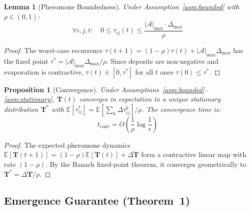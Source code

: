 \documentclass[review,3p,twocolumn]{elsarticle}
\newtheorem{lemma}[theorem]{Lemma}
\newtheorem{proposition}[theorem]{Proposition}
\newcommand{\calA}{\mathcal{A}}
\newcommand{\Tmat}{\mathbf{T}}
\begin{document}
\begin{lemma}[Pheromone Boundedness]
\label{lem:bound}
Under Assumption~\ref{asm:bounded} with $\rho \in (0,1)$:
\begin{equation}
\forall i, j, t: \quad 0 \leq \tau_{ij}(t) \leq \frac{|\calA|_{\max} \cdot \Delta_{\max}}{\rho}
\end{equation}
\end{lemma}

\begin{proof}
The worst-case recurrence $\tau(t{+}1) = (1{-}\rho)\tau(t) + |\calA|_{\max}\Delta_{\max}$ has the fixed point $\tau^* = |\calA|_{\max}\Delta_{\max}/\rho$. Since deposits are non-negative and evaporation is contractive, $\tau(t) \in [0, \tau^*]$ for all $t$ once $\tau(0) \leq \tau^*$.
\end{proof}

\begin{proposition}[Convergence]
\label{prop:convergence}
Under Assumptions~\ref{asm:bounded}--\ref{asm:stationary}, $\Tmat(t)$ converges in expectation to a unique stationary distribution $\Tmat^*$ with $\mathbb{E}[\tau_{ij}^*] = \mathbb{E}[\sum_k \Delta\tau_{ij}^k]/\rho$. The convergence time is:
\begin{equation}
t_{\mathrm{conv}} = O\!\left(\frac{1}{\rho} \log \frac{1}{\epsilon}\right)
\end{equation}
\end{proposition}

\begin{proof}
The expected pheromone dynamics $\mathbb{E}[\Tmat(t{+}1)] = (1{-}\rho)\mathbb{E}[\Tmat(t)] + \bar{\Delta\Tmat}$ form a contractive linear map with rate $(1{-}\rho)$. By the Banach fixed-point theorem, it converges geometrically to $\Tmat^* = \bar{\Delta\Tmat}/\rho$.
\end{proof}


\subsection{Emergence Guarantee (Theorem~1)}
\end{document}
